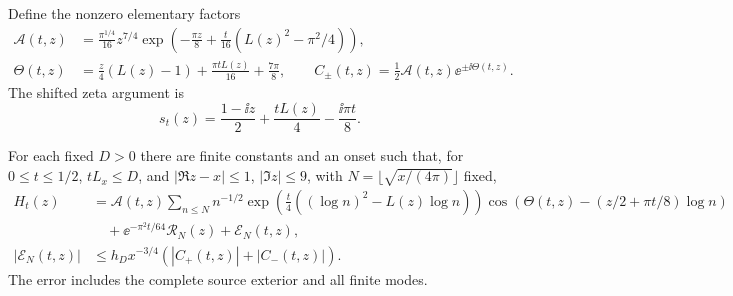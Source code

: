 Define the nonzero elementary factors
\begin{equation}\label{eq:carriers}
 \begin{split}
 \mathcal A(t,z)&=\frac{\pi^{1/4}}{16}z^{7/4}
 \exp\left(-\frac{\pi z}{8}+
       \frac{t}{16}(L(z)^2-\pi^2/4)\right),\\
 \Theta(t,z)&=\frac z4(L(z)-1)+\frac{\pi tL(z)}{16}+\frac{7\pi}{8},
 \qquad C_\pm(t,z)=\tfrac12\mathcal A(t,z)\ee^{\pm\ii\Theta(t,z)}.
 \end{split}
\end{equation}
The shifted zeta argument is
\begin{equation}\label{eq:shifted-s}
 s_t(z)=\frac{1-\ii z}{2}+\frac{tL(z)}4-\frac{\ii\pi t}{8}.
\end{equation}

\begin{proposition}\label{prop:positive-provider}
For each fixed $D>0$ there are finite constants and an onset such that,
for $0\le t\le1/2$, $tL_x\le D$, and $|\Re z-x|\le1$,
$|\Im z|\le9$, with $N=\lfloor\sqrt{x/(4\pi)}\rfloor$ fixed,
\begin{equation}\label{eq:provider}
 \begin{split}
 H_t(z)&=\mathcal A(t,z)\sum_{n\le N}n^{-1/2}
   \exp\left(\frac t4((\log n)^2-L(z)\log n)\right)
   \cos\left(\Theta(t,z)-(z/2+\pi t/8)\log n\right)\\
 &\quad+\ee^{-\pi^2t/64}\mathcal R_N(z)+\mathcal E_N(t,z),\\
 |\mathcal E_N(t,z)|&\le h_Dx^{-3/4}(|C_+(t,z)|+|C_-(t,z)|).
 \end{split}
\end{equation}
The error includes the complete source exterior and all finite modes.
\end{proposition}

